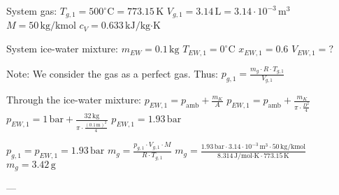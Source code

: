 System gas:  
\( T_{g,1} = 500^\circ \text{C} = 773.15 \, \text{K} \)  
\( V_{g,1} = 3.14 \, \text{L} = 3.14 \cdot 10^{-3} \, \text{m}^3 \)  
\( M = 50 \, \text{kg/kmol} \)  
\( c_V = 0.633 \, \text{kJ/kg·K} \)  

System ice-water mixture:  
\( m_{EW} = 0.1 \, \text{kg} \)  
\( T_{EW,1} = 0^\circ \text{C} \)  
\( x_{EW,1} = 0.6 \)  
\( V_{EW,1} = ? \)  

Note:  
We consider the gas as a perfect gas.  
Thus:  
\( p_{g,1} = \frac{m_g \cdot R \cdot T_{g,1}}{V_{g,1}} \)  

Through the ice-water mixture:  
\( p_{EW,1} = p_{\text{amb}} + \frac{m_K}{A} \)  
\( p_{EW,1} = p_{\text{amb}} + \frac{m_K}{\pi \cdot \frac{D^2}{4}} \)  
\( p_{EW,1} = 1 \, \text{bar} + \frac{32 \, \text{kg}}{\pi \cdot \frac{(0.1 \, \text{m})^2}{4}} \)  
\( p_{EW,1} = 1.93 \, \text{bar} \)  

\( p_{g,1} = p_{EW,1} = 1.93 \, \text{bar} \)  
\( m_g = \frac{p_{g,1} \cdot V_{g,1} \cdot M}{R \cdot T_{g,1}} \)  
\( m_g = \frac{1.93 \, \text{bar} \cdot 3.14 \cdot 10^{-3} \, \text{m}^3 \cdot 50 \, \text{kg/kmol}}{8.314 \, \text{J/mol·K} \cdot 773.15 \, \text{K}} \)  
\( m_g = 3.42 \, \text{g} \)  

---